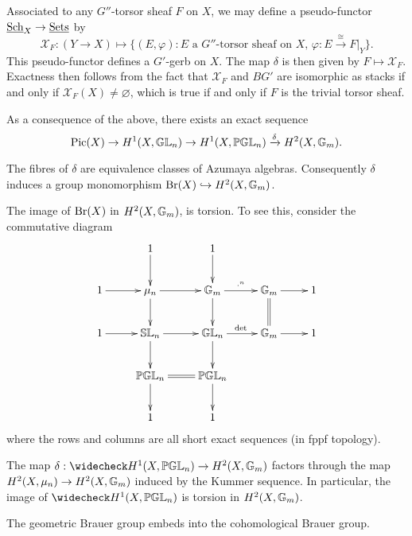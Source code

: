 Associated to any $G''$-torsor sheaf $F$ on $X$, we may define a pseudo-functor $\textnormal{\underline{Sch}}_X\rightarrow\textnormal{\underline{Sets}}$ by
$$\mathcal{X}_F: (Y\rightarrow X)\mapsto\{(E,\varphi): \text{$E$ a $G''$-torsor sheaf on $X$, $\varphi: E\xrightarrow{\cong} F|_Y$}\}.$$
This pseudo-functor defines a $G'$-gerb on $X$.  The map $\delta$ is then given by $F\mapsto \mathcal{X}_F$.  Exactness then follows from the fact that $\mathcal{X}_F$ and $BG'$ are isomorphic as stacks if and only if $\mathcal X_F(X)\neq\varnothing$, which is true if and only if $F$ is the trivial torsor sheaf.

As a consequence of the above, there exists an exact sequence
$$\textnormal{Pic}(X)\rightarrow H^1(X,\mathbb{GL}_n)\rightarrow H^1(X,\mathbb{PGL}_n)\xrightarrow{\delta} H^2(X,\mathbb{G}_m).$$

\begin{prop}
The fibres of $\delta$ are equivalence classes of Azumaya algebras.  Consequently $\delta$ induces a group monomorphism $\textnormal{Br}(X)\hookrightarrow  H^2(X,\mathbb{G}_m)$.
\end{prop}

The image of $\textnormal{Br}(X)$ in $H^2(X,\mathbb{G}_m)$, is torsion.  To see this, consider the commutative diagram
$$\xymatrix{
& 1\ar[d] & 1\ar[d]\\
1\ar[r] & \mu_n\ar[d]\ar[r] & \bbg_m\ar[d]\ar[r]^{\cdot^n} & \bbg_m\ar@{=}[d]\ar[r] & 1\\
1\ar[r] & \bbsl_n\ar[d]\ar[r] & \bbgl_n\ar[d]\ar[r]^{\det} & \bbg_m\ar[r] & 1\\
& \bbpgl_n\ar[d] \ar@{=}[r]& \bbpgl_n\ar[d]\\
& 1 & 1
}$$
where the rows and columns are all short exact sequences (in fppf topology).
\begin{prop}
The map $\delta: \wc H^1(X,\bbpgl_n)\rightarrow H^2(X,\bbg_m)$ factors through the map $H^2(X,\mu_n)\rightarrow H^2(X,\mathbb{G}_m)$ induced by the Kummer sequence.  In particular, the image of $\wc H^1(X,\bbpgl_n)$ is torsion in $H^2(X,\mathbb{G}_m)$.
\end{prop}
\begin{cor}
The geometric Brauer group embeds into the cohomological Brauer group.
\end{cor}

